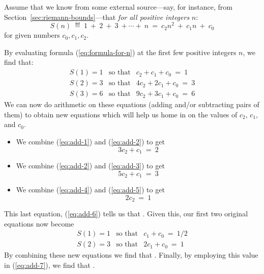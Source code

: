 Assume that we know from some external source---say, for instance,
from Section~\ref{sec:riemann-bounds}---that {\em for all positive
  integers} $n$:
\begin{equation}
\label{eq:formula-for-n}
S(n) \ \eqdef \
 1 \ + \ 2 \ + \ 3 \ + \cdots + \ n 
 \ = \ 
c_2 n^2 \ + \ c_1 n \ + \ c_0
\end{equation}
for given numbers $c_0, c_1, c_2$.

\noindent By evaluating formula (\ref{eq:formula-for-n}) at the first
few positive integers $n$, we find that:
\begin{eqnarray}
\label{eq:add-1}
S(1) = 1
 & \mbox{so that} &
 c_2 + c_1 + c_0 \ = \ 1 \\
\label{eq:add-2}
S(2) = 3
 & \mbox{so that} &
 4 c_2 + 2 c_1 + c_0 \ = \ 3 \\
\label{eq:add-3}
S(3) = 6
 & \mbox{so that} &
 9 c_2 + 3 c_1 + c_0 \ = \ 6
\end{eqnarray}
We can now do arithmetic on these equations (adding and/or subtracting
pairs of them) to obtain new equations which will help us home in on
the values of $c_2$, $c_1$, and $c_0$.
\begin{itemize}
\item
We combine (\ref{eq:add-1}) and (\ref{eq:add-2}) to get
\begin{equation}
\label{eq:add-4}
3c_2 + c_1 \ = \ 2
\end{equation}

\item
We combine (\ref{eq:add-2}) and (\ref{eq:add-3}) to get
\begin{equation}
\label{eq:add-5}
5 c_2 + c_1 \ = \ 3
\end{equation}

\item
We combine (\ref{eq:add-4}) and (\ref{eq:add-5}) to get
\begin{equation}
\label{eq:add-6}
2 c_2 \ = \ 1
\end{equation}
\end{itemize}
This last equation, (\ref{eq:add-6}) tells us that \fbox{$c_2 = {1
    \over 2}$}.  Given this, our first two original equations now
become
\begin{eqnarray}
\label{eq:add-7}
S(1) = 1
 & \mbox{so that} &
c_1 + c_0 \ = \ 1/2 \\
\label{eq:add-8}
S(2) = 3
 & \mbox{so that} &
2 c_1 + c_0 \ = \ 1
\end{eqnarray}
By combining these new equations we find that \fbox{$c_2 = {1 \over
    2}$}.  Finally, by employing this value in (\ref{eq:add-7}), we
find that \fbox{$c_0 = 0$}.

